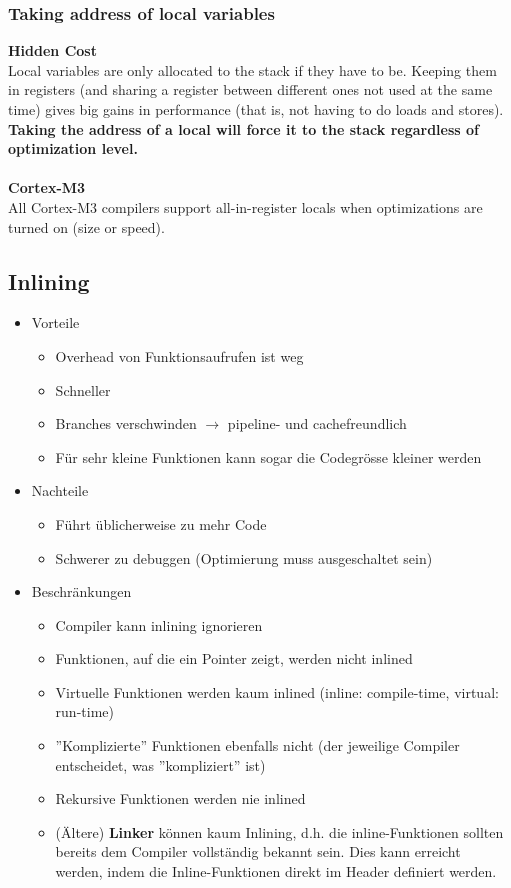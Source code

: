 \subsubsection{Taking address of local variables}
\textbf{Hidden Cost}\\
Local variables are only allocated to the stack if they have to be. Keeping them in registers (and sharing a register between different ones not used at the same time) gives big gains in performance (that is, not having to do loads and stores). \textbf{Taking the address of a local will force it to the stack regardless of optimization level.}\\
\\
\textbf{Cortex-M3}\\
All Cortex-M3 compilers support all-in-register locals when optimizations are turned on (size or speed).

\subsection{Inlining}
\begin{itemize}
	\item Vorteile
		\begin{itemize}
			\item Overhead von Funktionsaufrufen ist weg
			\item Schneller
			\item Branches verschwinden $\rightarrow$ pipeline- und cachefreundlich
			\item Für sehr kleine Funktionen kann sogar die Codegrösse kleiner werden
		\end{itemize}
	\item Nachteile
		\begin{itemize}
			\item Führt üblicherweise zu mehr Code
			\item Schwerer zu debuggen (Optimierung muss ausgeschaltet sein)
		\end{itemize}
	\item Beschränkungen
		\begin{itemize}
			\item Compiler kann inlining ignorieren
			\item Funktionen, auf die ein Pointer zeigt, werden nicht inlined
			\item Virtuelle Funktionen werden kaum inlined (inline: compile-time, virtual: run-time)
			\item ''Komplizierte'' Funktionen ebenfalls nicht (der jeweilige Compiler entscheidet, was ''kompliziert'' ist)
			\item Rekursive Funktionen werden nie inlined
			\item (Ältere) \textbf{Linker} können kaum Inlining, d.h. die inline-Funktionen sollten bereits dem Compiler vollständig bekannt sein. Dies kann erreicht werden, indem die Inline-Funktionen direkt im Header definiert werden.
		\end{itemize}
\end{itemize}

